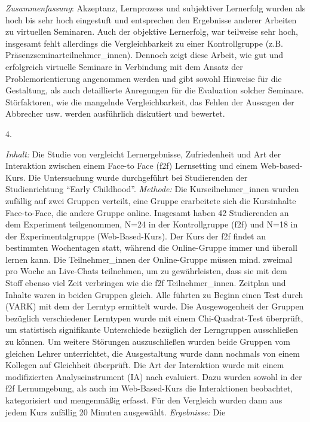 \emph{Zusammenfassung}: Akzeptanz, Lernprozess und subjektiver
Lernerfolg wurden als hoch bis sehr hoch eingestuft und entsprechen den
Ergebnisse anderer Arbeiten zu virtuellen Seminaren. Auch der objektive
Lernerfolg, war teilweise sehr hoch, insgesamt fehlt allerdings die
Vergleichbarkeit zu einer Kontrollgruppe (z.B.
Präsenzseminarteilnehmer\_innen). Dennoch zeigt diese Arbeit, wie gut
und erfolgreich virtuelle Seminare in Verbindung mit dem Ansatz der
Problemorientierung angenommen werden und gibt sowohl Hinweise für die
Gestaltung, als auch detaillierte Anregungen für die Evaluation solcher
Seminare. Störfaktoren, wie die mangelnde Vergleichbarkeit, das Fehlen
der Aussagen der Abbrecher usw. werden ausführlich diskutiert und
bewertet.

4.

\emph{Inhalt:} Die Studie von \textcite{mentzer2007two} vergleicht
Lernergebnisse, Zufriedenheit und Art der Interaktion zwischen einem
Face-to Face (f2f) Lernsetting und einem Web-based-Kurs. Die
Untersuchung wurde durchgeführt bei Studierenden der Studienrichtung
``Early Childhood''. \emph{Methode:} Die Kurseilnehmer\_innen wurden
zufällig auf zwei Gruppen verteilt, eine Gruppe erarbeitete sich die
Kursinhalte Face-to-Face, die andere Gruppe online. Insgesamt haben 42
Studierenden an dem Experiment teilgenommen, N=24 in der Kontrollgruppe
(f2f) und N=18 in der Experimentalgruppe (Web-Based-Kurs). Der Kurs der
f2f findet an bestimmten Wochentagen statt, während die Online-Gruppe
immer und überall lernen kann. Die Teilnehmer\_innen der Online-Gruppe
müssen mind. zweimal pro Woche an Live-Chats teilnehmen, um zu
gewährleisten, dass sie mit dem Stoff ebenso viel Zeit verbringen wie
die f2f Teilnehmer\_innen. Zeitplan und Inhalte waren in beiden Gruppen
gleich. Alle führten zu Beginn einen Test durch (VARK) mit dem der
Lerntyp ermittelt wurde. Die Ausgewogenheit der Gruppen bezüglich
verschiedener Lerntypen wurde mit einem Chi-Quadrat-Test überprüft, um
statistisch signifikante Unterschiede bezüglich der Lerngruppen
ausschließen zu können. Um weitere Störungen auszuschließen wurden beide
Gruppen vom gleichen Lehrer unterrichtet, die Ausgestaltung wurde dann
nochmals von einem Kollegen auf Gleichheit überprüft. Die Art der
Interaktion wurde mit einem modifizierten Analyseinstrument (IA) nach
\textcite{Flanders1961} evaluiert. Dazu wurden sowohl in der f2f
Lernumgebung, als auch im Web-Based-Kurs die Interaktionen beobachtet,
kategorisiert und mengenmäßig erfasst. Für den Vergleich wurden dann aus
jedem Kurs zufällig 20 Minuten ausgewählt. \emph{Ergebnisse:} Die
